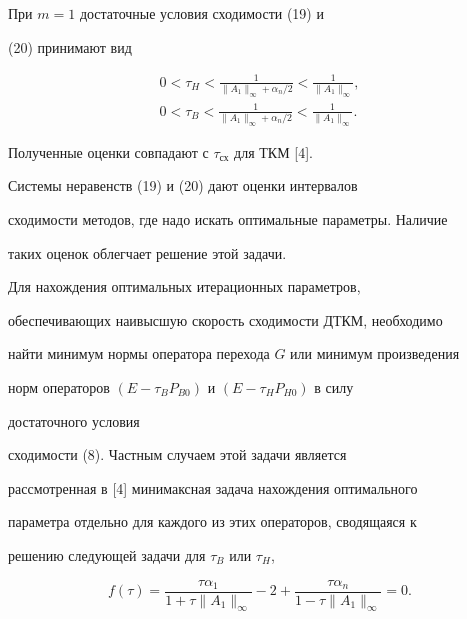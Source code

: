  


\begin{note} 


При $m=1$ достаточные условия сходимости (19) и  


(20) принимают вид 


\begin{gather*} 


0<\tau_H<\frac{1}{\|A_1\|_\infty+\alpha_n/2}< 


\frac{1}{\|A_1\|_\infty},\\ 


0<\tau_B<\frac{1}{\|A_1\|_\infty+\alpha_n/2}< 


\frac{1}{\|A_1\|_\infty}. 


\end{gather*} 


Полученные оценки совпадают с $\tau_{\text{сх}}$ для ТКМ [4]. 


\end{note} 


 


\begin{note} 


Системы неравенств (19) и (20) дают оценки интервалов  


сходимости методов, где надо искать оптимальные параметры. Наличие 


таких оценок облегчает решение этой задачи. 


\end{note} 


 


\begin{note} 


Для нахождения оптимальных итерационных параметров,  


обеспечивающих наивысшую скорость сходимости ДТКМ, необходимо  


найти минимум нормы оператора перехода $G$ или минимум произведения 


норм операторов $(E-\tau_B P_{B0})$ и $(E-\tau_H P_{H0})$ в силу 


достаточного условия  


сходимости (8). Частным случаем этой задачи является 


рассмотренная в [4] минимаксная задача нахождения оптимального  


параметра отдельно для каждого из этих операторов, сводящаяся к  


решению следующей задачи для $\tau_B$ или $\tau_H$, 


$$ 


f(\tau)=\frac{\tau\alpha_1}{1+\tau\|A_1\|_\infty}-2+ 


\frac{\tau\alpha_n}{1-\tau\|A_1\|_\infty}=0.


$$ 


\end{note} 


